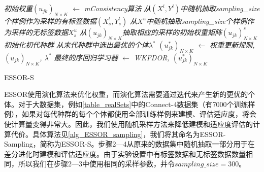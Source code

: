 \IncMargin{1em}
\begin{algorithm}
\emph{初始权重$(u_{jk})_{N \times K}$ $\leftarrow$ \textit{mConsistency}算法}\;
\emph{从$(X^{l},Y^{l})$中随机抽取sampling\_size个样例作为采样的有标签数据$(X_{s}^{l},Y_{s}^{l})$}\;
\emph{从$X^{u}$中随机抽取sampling\_size个样例作为采样的无标签数据$X_{s}^{u}$}\;
\emph{从$(u_{jk})_{N \times K}$抽取相应的采样的初始权重矩阵$(u_{jk})_{N \times K}^{s}$}\;
\emph{初始化初代种群}\;
\emph{从末代种群中选出最优的个体$\lambda^{*}$}\;
\emph{$(u_{jk}^{*})_{N \times K}$ $\leftarrow$ 权重更新规则, $(u_{jk})_{N \times K}$, $\lambda^{*}$}\;
\emph{最终的序回归学习器 $\leftarrow$ WKFDOR, $(u_{jk}^{*})_{N \times K}$}\;
\caption{ESSOR-S}\label{alg_ESSOR_sampling}
\end{algorithm}\DecMargin{1em}

ESSOR使用演化算法来优化权重，而演化算法需要通过迭代来产生新的更优的个体。对于大数据集，例如\autoref{table_realSets}中的Connect-4数据集（有7000个训练样例），如果对每代种群的每个个体都使用全部训练样例来建模、评估适应度，将会使计算量变得非常大。因此，我们使用随机采样方法来降低建模和适应度评估的计算代价。具体算法见\autoref{alg_ESSOR_sampling}，我们将其命名为ESSOR-Sampling，简称为ESSOR-S。步骤2—4从原来的数据集中随机抽取一部分用于在差分进化时建模和评估适应度。由于实验设置中有标签数据和无标签数据数量相同，所以我们在步骤2—3中使用相同的采样参数，并令\(sampling\_size = 300\)。

